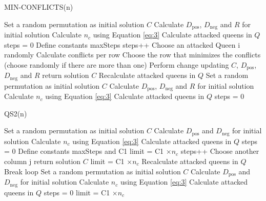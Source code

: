\begin{algorithm}
\caption{MIN-CONFLICTS(n)}\label{alg:min-conflicts}
\begin{algorithmic}[1]
\State Set a random permutation as initial solution $C$
\State Calculate $D_{\text{pos}}$, $D_{\text{neg}}$ and $R$ for initial solution
\State Calculate $n_c$ using Equation \ref{eq:3}
\State Calculate attacked queens in $Q$
\State steps = 0
\State Define constants maxSteps
\State steps++
\State Choose an attacked Queen i randomly
\State Calculate conflicts per row
\EndFor
\State Choose the row that minimizes the conflicts (choose randomly if there are more than one)
\State Perform change updating $C$, $D_{\text{pos}}$, $D_{\text{neg}}$ and $R$
\State return solution $C$
\Else
\State Recalculate attacked queens in $Q$
\EndIf
\EndWhile
\State Set a random permutation as initial solution $C$
\State Calculate $D_{\text{pos}}$, $D_{\text{neg}}$ and $R$ for initial solution
\State Calculate $n_c$ using Equation \ref{eq:3}
\State Calculate attacked queens in $Q$
\State steps = 0
\EndWhile
\end{algorithmic}
\end{algorithm}

\begin{algorithm}
\caption{QS2(n)}\label{alg:swap}
\begin{algorithmic}[1]
\State Set a random permutation as initial solution $C$
\State Calculate $D_{\text{pos}}$ and $D_{\text{neg}}$ for initial solution
\State Calculate $n_c$ using Equation \ref{eq:3}
\State Calculate attacked queens in $Q$
\State steps = 0
\State Define constants maxSteps and C1
\State limit = C1 $\times n_c$ 
\State steps++
\State Choose another column j
\State return solution $C$
\Else
{}
\State limit = C1 $\times n_c$ 
\State Recalculate attacked queens in $Q$
\State Break loop
\EndIf
\EndIf
\EndIf
\EndFor
\EndWhile
\State Set a random permutation as initial solution $C$
\State Calculate $D_{\text{pos}}$ and $D_{\text{neg}}$ for initial solution
\State Calculate $n_c$ using Equation \ref{eq:3}
\State Calculate attacked queens in $Q$
\State steps = 0
\State limit = C1 $\times n_c$ 
\EndWhile
\end{algorithmic}
\end{algorithm}

